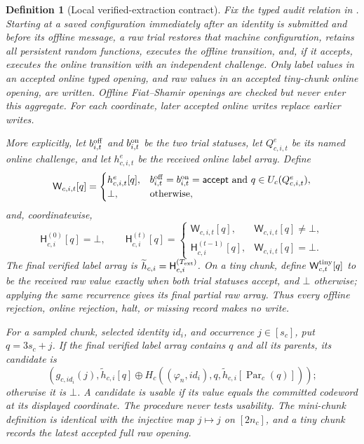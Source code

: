 \documentclass[11pt]{article}
\newtheorem{definition}[lemma]{Definition}
\begin{document}
\begin{definition}[Local verified-extraction contract]
\label{def:local-extraction}
Fix the typed audit relation in .
Starting at a saved configuration immediately after an identity is submitted
and before its offline message, a raw trial restores that machine
configuration, retains all persistent random functions, executes the offline
transition, and, if it accepts, executes the online transition with an
independent challenge.  Only label values in an accepted online typed opening,
and raw values in an accepted tiny-chunk online opening, are written.  Offline
Fiat--Shamir openings are checked but never enter this aggregate.  For each
coordinate, later accepted online writes replace earlier writes.

More explicitly, let $b^{\rm off}_{i,t}$ and $b^{\rm on}_{i,t}$ be the two
trial statuses, let $Q^e_{c,i,t}$ be its named online challenge, and let
$h^e_{c,i,t}$ be the received online label array.  Define
\[
 \mathsf W_{c,i,t}[q]=
 \begin{cases}
 h^e_{c,i,t}[q],&b^{\rm off}_{i,t}=b^{\rm on}_{i,t}=\mathsf{accept}
       \text{ and }q\in U_c(Q^e_{c,i,t}),\\
 \bot,&\text{otherwise},
 \end{cases}
\]
and, coordinatewise,
\[
 \mathsf H^{(0)}_{c,i}[q]=\bot,\qquad
 \mathsf H^{(t)}_{c,i}[q]=
 \begin{cases}
  \mathsf W_{c,i,t}[q],&\mathsf W_{c,i,t}[q]\ne\bot,\\
  \mathsf H^{(t-1)}_{c,i}[q],&\mathsf W_{c,i,t}[q]=\bot.
 \end{cases}
\tag{R1}\label{eq:verified-write-recurrence}
\]
The final verified label array is
$\widetilde h_{c,i}=\mathsf H^{(T_{\rm ext})}_{c,i}$.  On a tiny chunk, define
$\mathsf W^{\rm tiny}_{c,t}[q]$ to be the received raw value exactly when both
trial statuses accept, and $\bot$ otherwise; applying the same recurrence
gives its final partial raw array.  Thus every offline rejection, online
rejection, halt, or missing record makes no write.

For a sampled chunk, selected identity $\mathit{id}_i$, and occurrence
$j\in[s_c]$, put $q=3s_c+j$.  If the final
verified label array contains $q$ and all its parents, its candidate is
\[
 \left(g_{c,\mathit{id}_i}(j),
 \widetilde h_{c,i}[q]\mathbin\oplus
 H_c((\varphi_n,\mathit{id}_i),q,
   \widetilde h_{c,i}[\operatorname{Par}_c(q)])\right);
\tag{17}\label{eq:candidate}
\]
otherwise it is $\bot$.  A candidate is \emph{usable} if its value equals the
committed codeword at its displayed coordinate.  The procedure never tests
usability.  The mini-chunk definition is identical with the injective map
$j\mapsto j$ on $[2n_c]$, and a tiny chunk records the latest accepted full
raw opening.


\end{definition}
\end{document}
